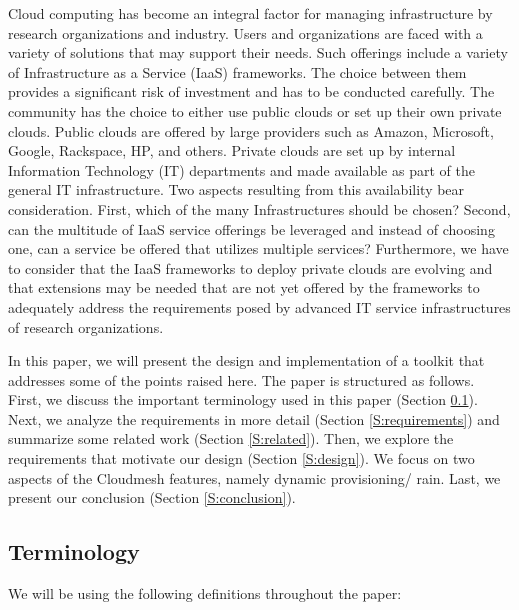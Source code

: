 \documentclass{tex/sig-alternate-2013}
\begin{document}
Cloud computing has become an integral factor for managing
infrastructure by research organizations and industry. Users and
organizations are faced with a variety of solutions that may support
their needs. Such offerings include a variety of Infrastructure as a
Service (IaaS) frameworks. The choice between them provides a
significant risk of investment and has to be conducted carefully. The
community has the choice to either use public clouds or set up their
own private clouds. Public clouds are offered by large providers such
as Amazon, Microsoft, Google, Rackspace, HP, and others. Private
clouds are set up by internal Information Technology (IT) departments
and made available as part of the general IT infrastructure. Two
aspects resulting from this availability bear consideration. First,
which of the many Infrastructures should be chosen? Second, can the
multitude of IaaS service offerings be leveraged and instead of
choosing one, can a service be offered that utilizes multiple
services? Furthermore, we have to consider that the IaaS frameworks to
deploy private clouds are evolving and that extensions may be needed
that are not yet offered by the frameworks to adequately address the
requirements posed by advanced IT service infrastructures of research
organizations.

In this paper, we will present the design and implementation of a
toolkit that addresses some of the points raised here.  The paper is
structured as follows. First, we discuss the important terminology
used in this paper (Section \ref{S:terminology}).  Next, we analyze
the requirements in more detail (Section \ref{S:requirements}) and
summarize some related work (Section \ref{S:related}).  Then, we
explore the requirements that motivate our design (Section
\ref{S:design}).
We focus on two aspects of the Cloudmesh features, namely dynamic
provisioning/ rain. Last, we present our conclusion (Section
\ref{S:conclusion}).



\subsection{Terminology} \label{S:terminology}

We will be using the following definitions throughout the paper:
\end{document}
